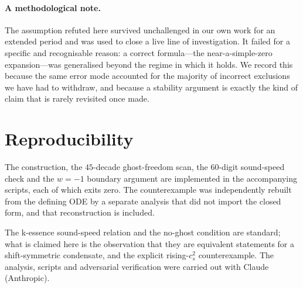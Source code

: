 \documentclass[aps,prd,twocolumn,superscriptaddress,nofootinbib,floatfix]{revtex4-2}
\begin{document}
\paragraph{A methodological note.} The assumption refuted here survived unchallenged in our own
work for an extended period and was used to close a live line of investigation. It failed for
a specific and recognisable reason: a correct formula---the near-a-simple-zero expansion---was
generalised beyond the regime in which it holds. We record this because the same error mode
accounted for the majority of incorrect exclusions we have had to withdraw, and because a
stability argument is exactly the kind of claim that is rarely revisited once made.

\section{Reproducibility}

The construction, the $45$-decade ghost-freedom scan, the $60$-digit sound-speed check and the
$w=-1$ boundary argument are implemented in the accompanying scripts, each of which exits zero.
The counterexample was independently rebuilt from the defining ODE by a separate analysis that
did not import the closed form, and that reconstruction is included.

\begin{acknowledgments}
The k-essence sound-speed relation and the no-ghost condition are standard; what is claimed
here is the observation that they are equivalent statements for a shift-symmetric condensate,
and the explicit rising-$c_s^2$ counterexample. The analysis, scripts and adversarial
verification were carried out with Claude (Anthropic).
\end{acknowledgments}
\end{document}
